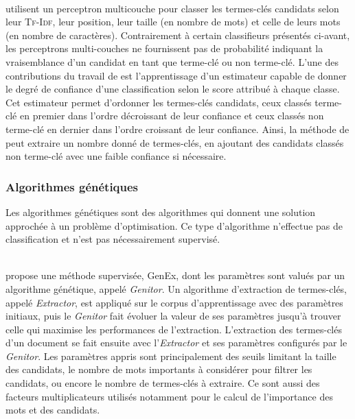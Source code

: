         ~\\ utilisent un perceptron multicouche
        pour classer les termes-clés candidats selon leur \textsc{Tf-Idf}, leur
        position, leur taille (en nombre de mots) et celle de leurs mots (en
        nombre de caractères). Contrairement à certain classifieurs présentés
        ci-avant, les perceptrons multi-couches ne fournissent pas de
        probabilité indiquant la vraisemblance d'un candidat en tant que
        \og{}terme-clé\fg{} ou \og{}non terme-clé\fg{}. L'une des contributions
        du travail de  est l'apprentissage d'un
        estimateur capable de donner le degré de confiance d'une classification
        selon le score attribué à chaque classe. Cet estimateur permet
        d'ordonner les termes-clés candidats, ceux classés \og{}terme-clé\fg{}
        en premier dans l'ordre décroissant de leur confiance et ceux classés
        \og{}non terme-clé\fg{} en dernier dans l'ordre croissant de leur
        confiance. Ainsi, la méthode de  peut
        extraire un nombre donné de termes-clés, en ajoutant des candidats
        classés \og{}non terme-clé\fg{} avec une faible confiance si nécessaire.

      \subsubsection{Algorithmes génétiques}
      \label{subsubsec:main-state_of_the_art-automatic_keyphrase_extraction-supervised_keyphrase_extraction-genex}
        Les algorithmes génétiques sont des algorithmes qui donnent une solution
        approchée à un problème d'optimisation. Ce type d'algorithme
        n'effectue pas de classification et n'est pas nécessairement supervisé.

        ~\\ propose une méthode
        supervisée, GenEx, dont les paramètres sont valués par un algorithme
        génétique, appelé \textit{Genitor}. Un algorithme d'extraction de
        termes-clés, appelé \textit{Extractor}, est appliqué sur le corpus
        d'apprentissage avec des paramètres initiaux, puis le \textit{Genitor}
        fait évoluer la valeur de ses paramètres jusqu'à trouver celle qui
        maximise les performances de l'extraction. L'extraction des termes-clés
        d'un document se fait ensuite avec l'\textit{Extractor} et ses
        paramètres configurés par le \textit{Genitor}. Les paramètres appris
        sont principalement des seuils limitant la taille des candidats, le
        nombre de mots importants à considérer pour filtrer les candidats, ou
        encore le nombre de termes-clés à extraire. Ce sont aussi des facteurs
        multiplicateurs utilisés notamment pour le calcul de l'importance des
        mots et des candidats.

